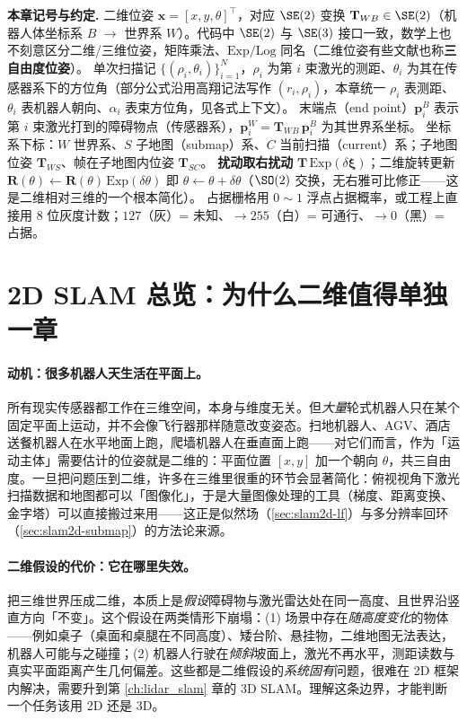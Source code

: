 \begin{note}
\textbf{本章记号与约定.}\;
二维位姿 $\mathbf{x}=[x,y,\theta]^\top$，对应 $\SE(2)$ 变换 $\mathbf{T}_{WB}\in\SE(2)$（机器人体坐标系 $B$ $\to$ 世界系 $W$）。代码中 $\SE(2)$ 与 $\SE(3)$ 接口一致，数学上也不刻意区分二维/三维位姿，矩阵乘法、$\mathrm{Exp}/\mathrm{Log}$ 同名（二维位姿有些文献也称\textbf{三自由度位姿}）。
单次扫描记 $\{(\rho_i,\theta_i)\}_{i=1}^N$，$\rho_i$ 为第 $i$ 束激光的测距、$\theta_i$ 为其在传感器系下的方位角（部分公式沿用高翔记法写作 $(r_i,\rho_i)$，本章统一 $\rho_i$ 表测距、$\theta_i$ 表机器人朝向、$\alpha_i$ 表束方位角，见各式上下文）。
末端点（end point）$\mathbf{p}_i^B$ 表示第 $i$ 束激光打到的障碍物点（传感器系），$\mathbf{p}_i^W=\mathbf{T}_{WB}\,\mathbf{p}_i^B$ 为其世界系坐标。
坐标系下标：$W$ 世界系、$S$ 子地图（submap）系、$C$ 当前扫描（current）系；子地图位姿 $\mathbf{T}_{WS}$、帧在子地图内位姿 $\mathbf{T}_{SC}$。
\textbf{扰动取右扰动} $\mathbf{T}\,\mathrm{Exp}(\delta\boldsymbol{\xi})$；二维旋转更新 $\mathbf{R}(\theta)\leftarrow\mathbf{R}(\theta)\,\mathrm{Exp}(\delta\theta)$ 即 $\theta\leftarrow\theta+\delta\theta$（$\SO(2)$ 交换，无右雅可比修正——这是二维相对三维的一个根本简化）。
占据栅格用 $0\!\sim\!1$ 浮点占据概率，或工程上直接用 $8$ 位灰度计数；$127$（灰）= 未知、$\to 255$（白）= 可通行、$\to 0$（黑）= 占据。
\end{note}

\section{2D SLAM 总览：为什么二维值得单独一章}
\label{sec:slam2d-overview}

\paragraph{动机：很多机器人天生活在平面上。}
所有现实传感器都工作在三维空间，本身与维度无关。但\emph{大量}轮式机器人只在某个固定平面上运动，并不会像飞行器那样随意改变姿态。扫地机器人、AGV、酒店送餐机器人在水平地面上跑，爬墙机器人在垂直面上跑——对它们而言，作为「运动主体」需要估计的位姿就是二维的：平面位置 $[x,y]$ 加一个朝向 $\theta$，共三自由度。一旦把问题压到二维，许多在三维里很重的环节会显著简化：俯视视角下激光扫描数据和地图都可以「图像化」，于是大量图像处理的工具（梯度、距离变换、金字塔）可以直接搬过来用——这正是似然场（\cref{sec:slam2d-lf}）与多分辨率回环（\cref{sec:slam2d-submap}）的方法论来源。

\paragraph{二维假设的代价：它在哪里失效。}
把三维世界压成二维，本质上是\emph{假设}障碍物与激光雷达处在同一高度、且世界沿竖直方向「不变」。这个假设在两类情形下崩塌：(1) 场景中存在\emph{随高度变化}的物体——例如桌子（桌面和桌腿在不同高度）、矮台阶、悬挂物，二维地图无法表达，机器人可能与之碰撞；(2) 机器人行驶在\emph{倾斜}坡面上，激光不再水平，测距读数与真实平面距离产生几何偏差。这些都是二维假设的\emph{系统固有}问题，很难在 2D 框架内解决，需要升到第 \cref{ch:lidar_slam} 章的 3D SLAM。理解这条边界，才能判断一个任务该用 2D 还是 3D。

